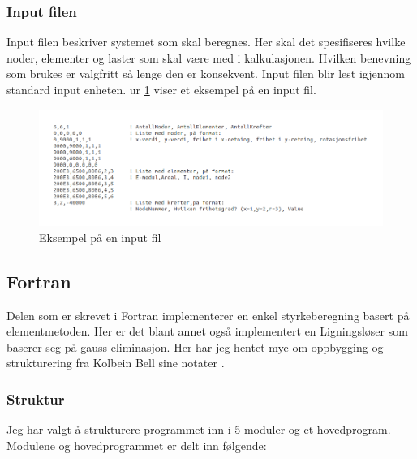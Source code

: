 \documentclass[10pt,a4paper, norsk]{article}
\begin{document}
\subsubsection{Input filen}
Input filen beskriver systemet som skal beregnes. Her skal det spesifiseres hvilke noder, elementer og laster som skal være med i kalkulasjonen. Hvilken benevning som brukes er valgfritt så lenge den er konsekvent. Input filen blir lest igjennom standard input enheten. 
ur \ref{fig:input} viser et eksempel på en input fil.

\begin{figure}[h]
\centering
\includegraphics[scale=0.5]{input.png} 
\caption{Eksempel på en input fil}
\label{fig:input}
\end{figure}


\subsection{Fortran}
Delen som er skrevet i Fortran implementerer en enkel styrkeberegning basert på elementmetoden. Her er det blant annet også implementert en Ligningsløser som baserer seg på gauss eliminasjon. Her har jeg hentet mye om oppbygging og strukturering fra Kolbein Bell sine notater \cite{KolbeinBellFortran} \cite{KolbeinBellProgram}.  


\subsubsection{Struktur}
Jeg har valgt å strukturere programmet inn i 5 moduler og et hovedprogram. Modulene og hovedprogrammet er delt inn følgende:
\end{document}
